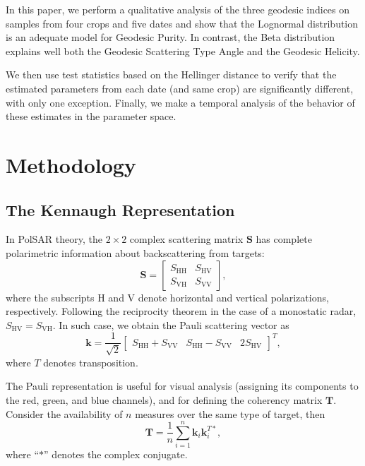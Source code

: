 \documentclass[journal]{IEEEtran}
\begin{document}
In this paper, we perform a qualitative analysis of the three geodesic indices on samples from four crops and five dates and show that the Lognormal distribution is an adequate model for Geodesic Purity. 
In contrast, the Beta distribution explains well both the Geodesic Scattering Type Angle and the Geodesic Helicity.

We then use test statistics based on the Hellinger distance to verify that the estimated parameters from each date (and same crop) are significantly different, with only one exception.
Finally, we make a temporal analysis of the behavior of these estimates in the parameter space.

\section{Methodology}

\subsection{The Kennaugh Representation}

In PolSAR theory, the $2 \times 2$ complex scattering matrix $\bm S$ has
complete polarimetric information about backscattering
from targets:
$$
\bm S = \begin{bmatrix}
S_{\text{HH}} &S_{\text{HV}}\\
S_{\text{VH}} &S_{\text{VV}}
\end{bmatrix},
$$
where the subscripts $\text{H}$ and $\text{V}$ denote horizontal and vertical
polarizations, respectively. 
Following the reciprocity theorem
in the case of a monostatic radar, 
$S_{\text{HV}}=S_{\text{VH}}$.
In such case, we obtain the Pauli scattering vector as
$$
\bm k = \frac1{\sqrt{2}}
\begin{bmatrix}
S_{\text{HH}} + S_{\text{VV}} 
& S_{\text{HH}} - S_{\text{VV}} 
& 2S_{\text{HV}}
\end{bmatrix}^T,
$$
where $T$ denotes transposition.

The Pauli representation is useful for visual analysis (assigning its components to the red, green, and blue channels), and for defining the coherency matrix $\bm T$.
Consider the availability of $n$ measures over the same type of target, then
$$
\bm T = \frac{1}{n} \sum_{i=1}^{n}\bm k_i \bm k_i^{T*},
$$
where ``$*$'' denotes the complex conjugate.
\end{document}
